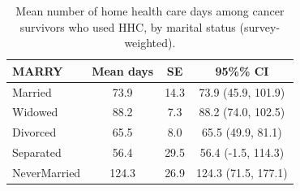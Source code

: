 
\begin{longtable}[t]{lccc}
\caption{\label{tab:tab:days-marital}Mean number of home health care days among cancer survivors who used HHC, by marital status (survey-weighted).}\\
\toprule
MARRY & Mean days & SE & 95\%\% CI\\
\midrule
Married & 73.9 & 14.3 & 73.9 (45.9, 101.9)\\
Widowed & 88.2 & 7.3 & 88.2 (74.0, 102.5)\\
Divorced & 65.5 & 8.0 & 65.5 (49.9, 81.1)\\
Separated & 56.4 & 29.5 & 56.4 (-1.5, 114.3)\\
NeverMarried & 124.3 & 26.9 & 124.3 (71.5, 177.1)\\
\bottomrule
\end{longtable}
